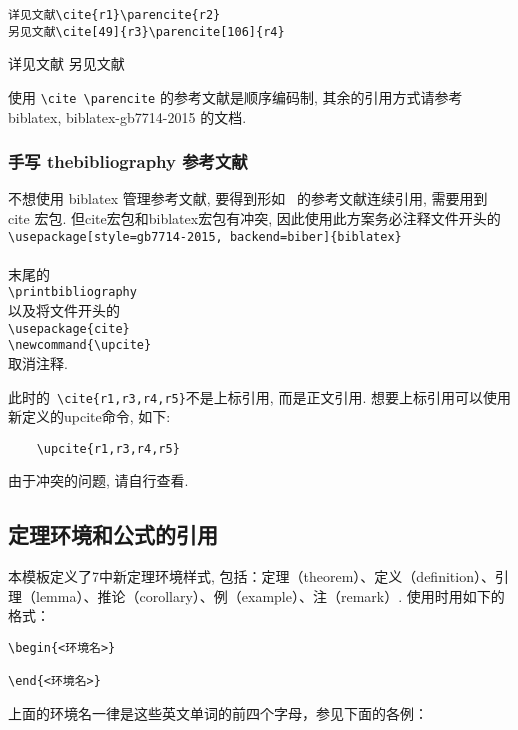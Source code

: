 \begin{lstlisting}
详见文献\cite{r1}\parencite{r2}
另见文献\cite[49]{r3}\parencite[106]{r4}
\end{lstlisting}

详见文献\cite{r1}\parencite{r2}
另见文献\cite[49]{r3}\parencite[106]{r4}

使用 \verb|\cite \parencite| 的参考文献是顺序编码制, 其余的引用方式请参考 biblatex, biblatex-gb7714-2015 的文档.\the\baselineskip

\subsubsection{手写 thebibliography 参考文献\the\baselineskip}
\the\baselineskip
不想使用 biblatex 管理参考文献, 要得到形如~{\cite{r1,r3,r4,r5}} 的参考文献连续引用, 需要用到 cite 宏包. 但cite宏包和biblatex宏包有冲突, 因此使用此方案务必注释文件开头的\\
\verb|\usepackage[style=gb7714-2015, backend=biber]{biblatex}|\\
\verb||\\
末尾的\\
\verb|\printbibliography|\\
以及将文件开头的\\
\verb|\usepackage{cite}|\\
\verb|\newcommand{\upcite}|\\
取消注释.

此时的~\verb|\cite{r1,r3,r4,r5}|不是上标引用, 而是正文引用. 想要上标引用可以使用新定义的upcite命令, 如下:
\begin{lstlisting}
    \upcite{r1,r3,r4,r5}
\end{lstlisting}
由于冲突的问题, 请自行查看.

\subsection{定理环境和公式的引用}

本模板定义了7中新定理环境样式, 包括：定理（theorem）、定义（definition）、引理（lemma）、推论（corollary）、例（example）、注（remark）. 使用时用如下的格式：
\begin{lstlisting}
\begin{<环境名>}

\end{<环境名>}
\end{lstlisting}

上面的环境名一律是这些英文单词的前四个字母，参见下面的各例：

